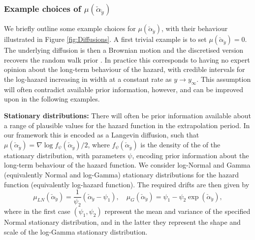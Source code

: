 \documentclass[ba,preprint]{imsart}
\theoremstyle{plain}
\theoremstyle{definition}
\theoremstyle{remark}
\begin{document}
\subsubsection{Example choices of $\mu(\check{\alpha}_{\check{y}})$}

We briefly outline some example choices for $\mu(\check{\alpha}_{\check{y}})$, with their behaviour illustrated in Figure \ref{fig:Diffusions}. A first trivial example is to set $\mu(\check{\alpha}_{\check{y}}) = 0$. The underlying diffusion is then a Brownian motion and the discretised version recovers the random walk prior \citep{Fahrmeir2001}. In practice this corresponds to having no expert opinion about the long-term behaviour of the hazard, with credible intervals for the log-hazard increasing in width at a constant rate as $y \to y_\infty$. This assumption will often contradict available prior information, however, and can be improved upon in the following examples.

\textbf{Stationary distributions:} There will often be prior information available about a range of plausible values for the hazard function in the extrapolation period. In our framework this is encoded as a Langevin diffusion, such that $\mu(\check{\alpha}_{\check{y}}) = \nabla\log f_\psi(\check{\alpha}_{\check{y}})/2$, where $f_\psi(\check{\alpha}_{\check{y}})$ is the density of the {\color{red} of the stationary distribution, with parameters $\psi$, encoding prior information about the long-term behaviour of the hazard function.} We consider log-Normal and Gamma (equivalently Normal and log-Gamma) stationary distributions for the hazard function (equivalently log-hazard function). The required drifts are then given by
\begin{equation}
    \label{eq;Langevin}
    \mu_{LN}(\check{\alpha}_{\check{y}}) = \frac{1}{\psi_2}(\check{\alpha}_{\check{y}} - \psi_1), \quad \mu_G(\check{\alpha}_{\check{y}}) = \psi_1 - \psi_2\exp(\check{\alpha}_{\check{y}}),
\end{equation}
{where in the first case $(\psi_1,\psi_2)$ represent the mean and variance of the specified Normal stationary distribution, and in the latter they represent the shape and scale of the log-Gamma stationary distribution.}
\end{document}
